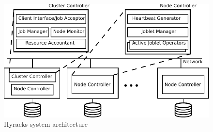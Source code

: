 \begin{figure}
\centering
\includegraphics[scale=0.8]{images/architecture}
\caption{Hyracks system architecture}\label{fig:sysarch}
\end{figure}


